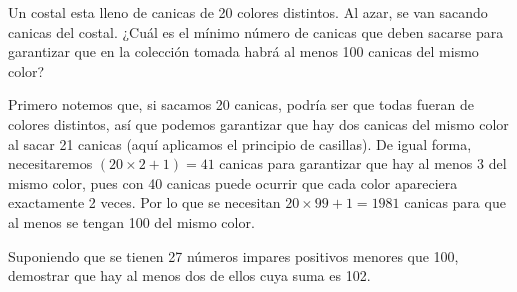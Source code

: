 \begin{ejemplo}
    Un costal esta lleno de canicas de 20 colores distintos. Al azar, se van sacando canicas del costal. ¿Cuál es el mínimo número de canicas que deben sacarse para garantizar que en la colección tomada habrá al menos 100 canicas del mismo color?
\end{ejemplo}

\begin{solucion}
    Primero notemos que, si sacamos 20 canicas, podría ser que todas fueran de colores distintos, así que podemos garantizar que hay dos canicas del mismo color al sacar 21 canicas (aquí aplicamos el principio de casillas). De igual forma, necesitaremos $(20 \times 2 + 1) = 41$ canicas para garantizar que hay al menos 3 del mismo color, pues con 40 canicas puede ocurrir que cada color apareciera exactamente 2 veces. Por lo que se necesitan $20 \times 99 + 1 = 1981$ canicas para que al menos se tengan 100 del mismo color.
\end{solucion}

\begin{ejemplo}
    Suponiendo que se tienen 27 números impares positivos menores que 100, demostrar que hay al menos dos de ellos cuya suma es 102.
\end{ejemplo}

